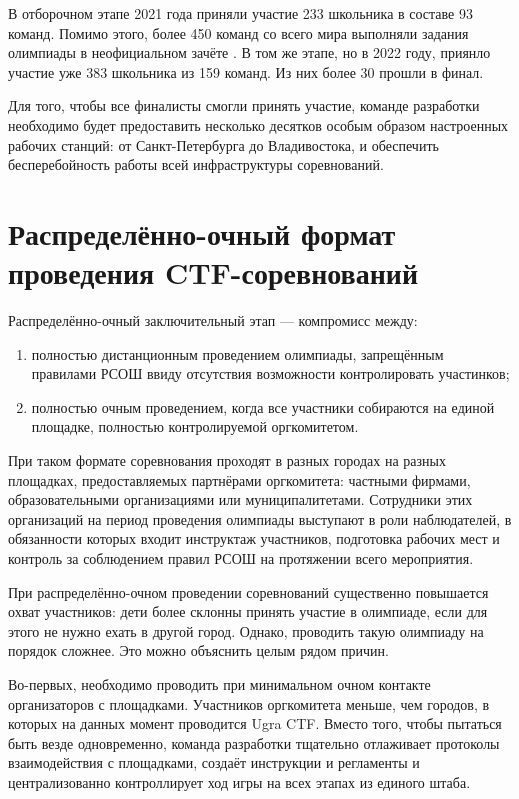 В отборочном этапе 2021 года приняли участие 233 школьника в составе 93 команд. Помимо этого, более 450 команд со всего мира выполняли задания олимпиады в неофициальном зачёте \cite{Ugra21}. В том же этапе, но в 2022 году, приянло участие уже 383 школьника из 159 команд. Из них более 30 прошли в финал.

Для того, чтобы все финалисты смогли принять участие, команде разработки необходимо будет предоставить несколько десятков особым образом настроенных рабочих станций: от Санкт-Петербурга до Владивостока, и обеспечить бесперебойность работы всей инфраструктуры соревнований.


\section{Распределённо-очный формат проведения CTF-соревнований}
\label{cha:analysis:}


Распределённо-очный заключительный этап --- компромисс между:
\begin{enumerate}
  \item полностью дистанционным проведением олимпиады, запрещённым правилами РСОШ ввиду отсутствия возможности контролировать участинков;
  \item полностью очным проведением, когда все участники собираются на единой площадке, полностью контролируемой оргкомитетом.
\end{enumerate}

При таком формате соревнования проходят в разных городах на разных площадках, предоставляемых партнёрами оргкомитета: частными фирмами, образовательными организациями или муниципалитетами.
Сотрудники этих организаций на период проведения олимпиады выступают в роли наблюдателей, в обязанности которых входит инструктаж участников, подготовка рабочих мест и контроль за соблюдением правил РСОШ на протяжении всего мероприятия.

При распределённо-очном проведении соревнований существенно повышается охват участников: дети более склонны принять участие в олимпиаде, если для этого не нужно ехать в другой город. Однако, проводить такую олимпиаду на порядок сложнее. Это можно объяснить целым рядом причин.

Во-первых, необходимо проводить при минимальном очном контакте организаторов с площадками. Участников оргкомитета меньше, чем городов, в которых на данных момент проводится Ugra CTF. Вместо того, чтобы пытаться быть везде одновременно, команда разработки тщательно отлаживает протоколы взаимодействия с площадками, создаёт инструкции и регламенты и централизованно контроллирует ход игры на всех этапах из единого штаба.

